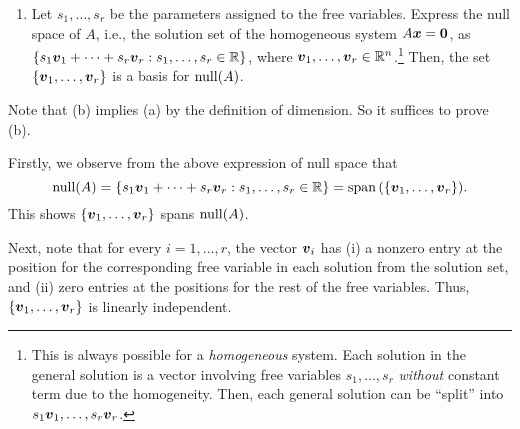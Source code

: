 \begin{enumerate}
\begin{theorem}
\begin{enumerate}
\item Let \(s_1,\dotsc,s_r\) be the parameters assigned to the free variables.
Express the null space of \(A\), i.e., the solution set of the homogeneous
system \(A\vb*{x}=\vb*{0}\), as
\(\{s_1\vb*{v}_1+\dotsb+s_r\vb*{v}_r:s_1,\dotsc,s_r\in\mathbb{R}\}\), where
\(\vb*{v}_1,\dotsc,\vb*{v}_r\in\mathbb{R}^n\).\footnote{This is always possible for a
\emph{homogeneous} system. Each solution in the general solution is a vector
involving free variables \(s_1,\dotsc,s_r\) \emph{without} constant term due to
the homogeneity. Then, each general solution can be ``split'' into
\(s_1\vb*{v}_1,\dotsc,s_r\vb*{v}_r\).} Then, the set
\(\{\vb*{v}_1,\dotsc,\vb*{v}_r\}\) is a basis for \(\operatorname{null}(A)\).
\end{enumerate}
\end{theorem}
\begin{pf}
Note that (b) implies (a) by the definition of dimension. So it suffices to
prove (b).

Firstly, we observe from the above expression of null space that
\[
\operatorname{null}(A)=\{s_1\vb*{v}_1+\dotsb+s_r\vb*{v}_r:s_1,\dotsc,s_r\in\mathbb{R}\}
=\operatorname{span}\qty(\{\vb*{v}_1,\dotsc,\vb*{v}_r\}).
\]
This shows \(\{\vb*{v}_1,\dotsc,\vb*{v}_r\}\) spans \(\operatorname{null}(A)\).

Next, note that for every \(i=1,\dotsc,r\), the vector \(\vb*{v}_i\) has (i) a
nonzero entry at the position for the corresponding free variable in each
solution from the solution set, and (ii) zero entries at the positions for the
rest of the free variables. Thus, \(\{\vb*{v}_1,\dotsc,\vb*{v}_r\}\) is
linearly independent.
\end{pf}
\end{enumerate}
